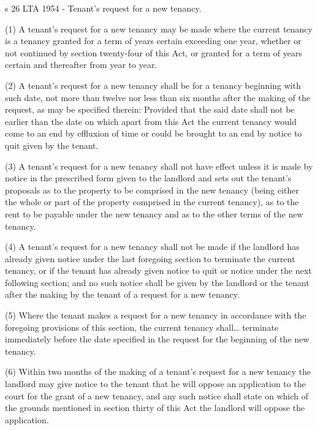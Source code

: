 \documentclass[
]{article}
\newenvironment{env-2aad614f-6fd6-4025-876c-fcdbeae766fb}
{
    \savenotes\tcolorbox[blanker,breakable,left=5pt,borderline west={2pt}{-4pt}{green}]
}
{
    \endtcolorbox\spewnotes
}
\begin{document}
\begin{env-2aad614f-6fd6-4025-876c-fcdbeae766fb}

s 26 LTA 1954 - Tenant's request for a new tenancy.

(1) A tenant's request for a new tenancy may be made where the current
tenancy is a tenancy granted for a term of years certain exceeding one
year, whether or not continued by section twenty-four of this Act, or
granted for a term of years certain and thereafter from year to year.

(2) A tenant's request for a new tenancy shall be for a tenancy
beginning with such date, not more than twelve nor less than six months
after the making of the request, as may be specified therein: Provided
that the said date shall not be earlier than the date on which apart
from this Act the current tenancy would come to an end by effluxion of
time or could be brought to an end by notice to quit given by the
tenant.

(3) A tenant's request for a new tenancy shall not have effect unless it
is made by notice in the prescribed form given to the landlord and sets
out the tenant's proposals as to the property to be comprised in the new
tenancy (being either the whole or part of the property comprised in the
current tenancy), as to the rent to be payable under the new tenancy and
as to the other terms of the new tenancy.

(4) A tenant's request for a new tenancy shall not be made if the
landlord has already given notice under the last foregoing section to
terminate the current tenancy, or if the tenant has already given notice
to quit or notice under the next following section; and no such notice
shall be given by the landlord or the tenant after the making by the
tenant of a request for a new tenancy.

(5) Where the tenant makes a request for a new tenancy in accordance
with the foregoing provisions of this section, the current tenancy
shall\ldots{} terminate immediately before the date specified in the
request for the beginning of the new tenancy.

(6) Within two months of the making of a tenant's request for a new
tenancy the landlord may give notice to the tenant that he will oppose
an application to the court for the grant of a new tenancy, and any such
notice shall state on which of the grounds mentioned in section thirty
of this Act the landlord will oppose the application.

\end{env-2aad614f-6fd6-4025-876c-fcdbeae766fb}
\end{document}
